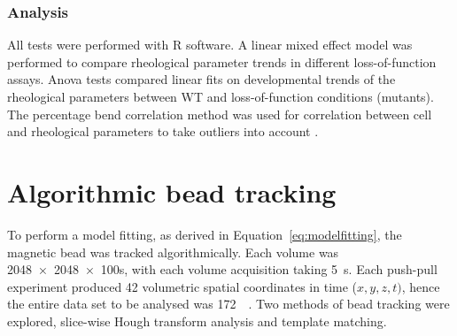 \subsubsection{Analysis}

All tests were performed with R software.
A linear mixed effect model was performed to compare rheological parameter trends in different loss-of-function assays.
Anova tests compared linear fits on developmental trends of the rheological parameters between \gls{WT} and loss-of-function conditions (mutants).
The percentage bend correlation method was used for correlation between cell and rheological parameters to take outliers into account \cite{wilcoxPercentageBendCorrelation1994}. %

%
%

\section{Algorithmic bead tracking}

To perform a model fitting, as derived in Equation~\eqref{eq:modelfitting}, the magnetic bead was tracked algorithmically.
Each volume was \SI{2048 x 2048 x 100}{}s, with each volume acquisition taking \SI{5}{\second}.
Each push-pull experiment produced 42 volumetric spatial coordinates in time (\(x,y,z,t)\), hence the entire data set to be analysed was \SI{172}{\giga\byte}.
Two methods of bead tracking were explored, slice-wise Hough transform analysis and template matching.
%

